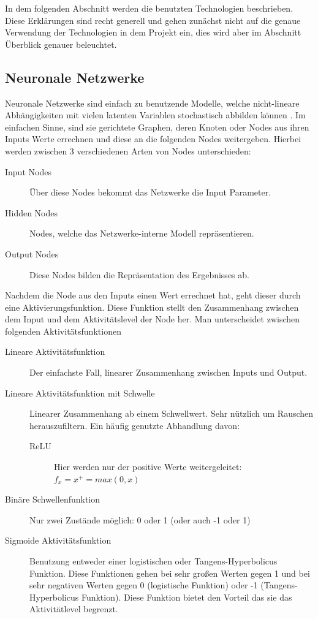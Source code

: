 \documentclass[pdftex,a4paper,halfparskip, article]{scrartcl}
\begin{document}
In dem folgenden Abschnitt werden die benutzten Technologien beschrieben. Diese Erklärungen sind recht generell und gehen zunächst nicht auf die genaue Verwendung der Technologien in dem Projekt ein, dies wird aber im Abschnitt Überblick genauer beleuchtet.

\subsection{Neuronale Netzwerke}
Neuronale Netzwerke sind einfach zu benutzende Modelle, welche nicht-lineare Abhängigkeiten mit vielen latenten Variablen stochastisch abbilden können \cite{nnWebsite}. Im einfachen Sinne, sind sie gerichtete Graphen, deren Knoten oder Nodes aus ihren Inputs Werte errechnen und diese an die folgenden Nodes weitergeben. Hierbei werden zwischen 3 verschiedenen Arten von Nodes unterschieden:

\begin{description}
	\item[Input Nodes] Über diese Nodes bekommt das Netzwerke die Input Parameter.
	\item[Hidden Nodes] Nodes, welche das Netzwerke-interne Modell repräsentieren.
	\item[Output Nodes] Diese Nodes bilden die Repräsentation des Ergebnisses ab.
\end{description}

Nachdem die Node aus den Inputs einen Wert errechnet hat, geht dieser durch eine Aktivierungsfunktion. Diese Funktion stellt den Zusammenhang zwischen dem Input und dem Aktivitätslevel der Node her. Man unterscheidet zwischen folgenden Aktivitätsfunktionen

\begin{description}
	\item[Lineare Aktivitätsfunktion] Der einfachste Fall, linearer Zusammenhang zwischen Inputs und Output.
	\item[Lineare Aktivitätsfunktion mit Schwelle] Linearer Zusammenhang ab einem Schwellwert. Sehr nützlich um Rauschen herauszufiltern. Ein häufig genutzte Abhandlung davon:
	\begin{description}
		\item[ReLU] Hier werden nur der positive Werte weitergeleitet: \(f_x = x^+ = max(0,x) \)
	\end{description}
	\item[Binäre Schwellenfunktion] Nur zwei Zustände möglich: 0 oder 1 (oder auch -1 oder 1)
	\item[Sigmoide Aktivitätsfunktion] Benutzung entweder einer logistischen oder Tangens-Hyperbolicus Funktion. Diese Funktionen gehen bei sehr großen Werten gegen 1 und bei sehr negativen Werten gegen 0 (logistische Funktion) oder -1 (Tangens-Hyperbolicus Funktion). Diese Funktion bietet den Vorteil das sie das Aktivitätlevel begrenzt.
\end{description} 
\end{document}
